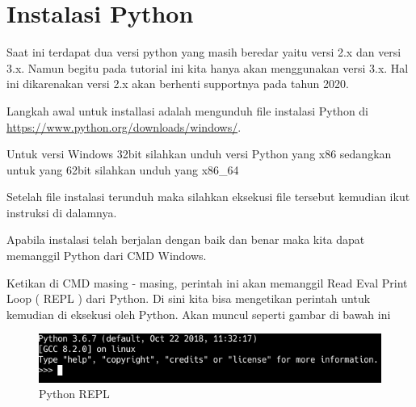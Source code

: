 \section{Instalasi Python}
Saat ini terdapat dua versi python yang masih beredar yaitu versi 2.x dan versi 3.x.
Namun begitu pada tutorial ini kita hanya akan menggunakan versi 3.x. Hal ini dikarenakan
versi 2.x akan berhenti supportnya pada tahun 2020.

Langkah awal untuk installasi adalah mengunduh file instalasi Python di \url{https://www.python.org/downloads/windows/}.

Untuk versi Windows 32bit silahkan unduh versi Python yang x86 sedangkan untuk yang 62bit silahkan unduh yang x86\_64

Setelah file instalasi terunduh maka silahkan eksekusi file tersebut kemudian ikut instruksi di dalamnya.

Apabila instalasi telah berjalan dengan baik dan benar maka kita dapat memanggil Python dari CMD Windows. 

Ketikan  di CMD masing - masing, perintah ini akan memanggil Read Eval Print Loop ( REPL ) dari Python.
Di sini kita bisa mengetikan perintah untuk kemudian di eksekusi oleh Python. Akan muncul seperti gambar di bawah ini
\begin{figure}[h]
\begin{center}
\includegraphics[width=0.8\linewidth]{img/python}
\caption{Python REPL}
\end{center}
\end{figure}
\newpage
